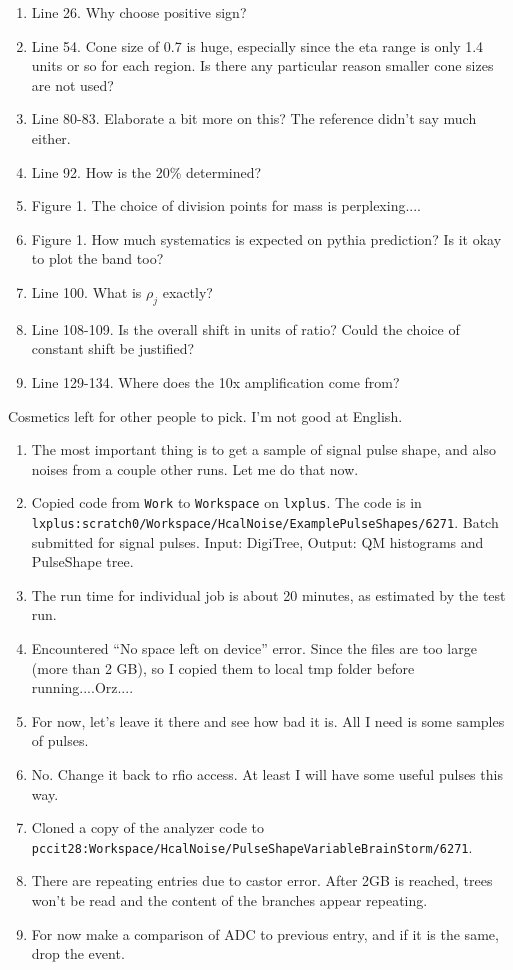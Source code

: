 \begin{enumerate}
\item Line 26.  Why choose positive sign?
\item Line 54.  Cone size of 0.7 is huge, especially since the eta range is only 1.4 units or so for each region.
Is there any particular reason smaller cone sizes are not used?
\item Line 80-83.  Elaborate a bit more on this?  The reference didn't say much either.
\item Line 92.  How is the 20\% determined?
\item Figure 1.  The choice of division points for mass is perplexing....
\item Figure 1.  How much systematics is expected on pythia prediction?  Is it okay to plot the band too?
\item Line 100.  What is $\rho_j$ exactly?
\item Line 108-109.  Is the overall shift in units of ratio?  Could the choice of constant shift be justified?
\item Line 129-134.  Where does the 10x amplification come from?
\end{enumerate}

Cosmetics left for other people to pick.  I'm not good at English.


\begin{enumerate}
\item The most important thing is to get a sample of signal pulse shape, and also noises from a couple other runs.  Let me do that now.
\item Copied code from \texttt{Work} to \texttt{Workspace} on \texttt{lxplus}.  The code is in \\
\texttt{lxplus:scratch0/Workspace/HcalNoise/ExamplePulseShapes/6271}.  Batch submitted for signal pulses.
Input: DigiTree, Output: QM histograms and PulseShape tree.
\item The run time for individual job is about 20 minutes, as estimated by the test run.
\item Encountered ``No space left on device'' error.  Since the files are too large (more than 2 GB), so I copied them to local tmp folder before running....Orz....
\item For now, let's leave it there and see how bad it is.  All I need is some samples of pulses.
\item No.  Change it back to rfio access.  At least I will have some useful pulses this way.
\item Cloned a copy of the analyzer code to \\
\texttt{pccit28:Workspace/HcalNoise/PulseShapeVariableBrainStorm/6271}.
\item There are repeating entries due to castor error.  After 2GB is reached, trees won't be read and the content of the branches appear repeating.
\item For now make a comparison of ADC to previous entry, and if it is the same, drop the event.
\end{enumerate}

